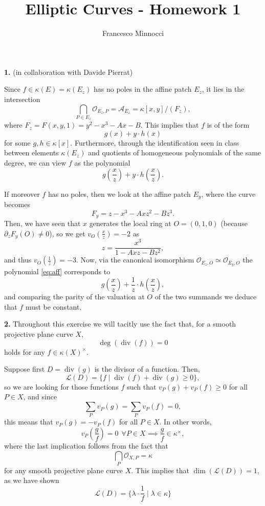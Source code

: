 \documentclass[a4paper]{article}
\title{Elliptic Curves - Homework 1}
\author{Francesco Minnocci}
\renewcommand{\L}{\mathcal{L}}
\renewcommand{\div}{\operatorname{div}}
\renewcommand{\k}{\kappa}
\theoremstyle{definition}
\theoremstyle{definition}
\theoremstyle{remark}
\theoremstyle{definition}
\begin{document}
\maketitle

\textbf{1. }(in collaboration with Davide Pierrat)

Since $f\in \k(E)=\k(E_z)$ has no poles in the affine patch $E_z$, it lies in the intersection
\[
	\bigcap_{P \in E_z} \mathcal{O}_{E_z,P}= \mathcal{A}_{E_z}= \k[x,y]/(F_z),
\]
where $F_z=F(x,y,1)=y^2-x^3-Ax-B$. This implies that $f$ is of the form
\begin{equation}\label{eq:aff}
	g(x)+y\cdot h(x)
\end{equation} for some $g,h \in \k[x]$. Furthermore, through the identification seen in class between elements $\k(E_z)$ and quotients of homogeneous polynomials of the same degree, we can view $f$ as the polynomial
\[
	g\left(\frac{x}{z}\right)+y\cdot h\left(\frac{x}{z}\right).
\]

If moreover $f$ has no poles, then we look at the affine patch $E_y$, where the curve becomes
\[
	F_y=z-x^3-Axz^2-Bz^3.
\]
Then, we have seen that $x$ generates the local ring at $O=(0,1,0)$ (because $\partial_z{F_y}(O)\neq 0$), so we get $v_O{\left(\frac{x}{z}\right)}=-2$ as
\[
	z= \frac{x^3}{1-Axz-Bz^2},
\]
and thus $v_O{\left(\frac{1}{z}\right)}=-3$. Now, via the canonical isomorphism $\mathcal{O}_{E_z,O}\simeq \mathcal{O}_{E_y,O}$ the polynomial \eqref{eq:aff} corresponds to
\[
	g\left(\frac{x}{z}\right)+\frac{1}{z}\cdot h\left(\frac{x}{z}\right),
\]
and comparing the parity of the valuation at $O$ of the two summands we deduce that $f$ must be constant.


\textbf{2.} Throughout this exercise we will tacitly use the fact that, for a smooth projective plane curve $X$,
\[\deg(\div(f))=0\] holds for any $f\in \k(X)^\times$.

Suppose first $D=\div(g)$ is the divisor of a function. Then,
\[
	\L(D)=\{f\mid\div(f)+\div(g)\geq 0\},
\]
so we are looking for those functions $f$ such that $v_P(g)+v_P(f)\geq 0$ for all $P\in X$, and since
\[
	\sum_P{v_P(g)}=\sum_P{v_P(f)}=0,
\]
this means that $v_P(g)=-v_P(f)$ for all $P\in X$. In other words,
\[
	v_P\left(\frac{g}{f}\right)=0 ~~ \forall P \in X \implies \frac{g}{f}\in\k^\times,
\]
where the last implication follows from the fact that
\[
	\bigcap_P{\mathcal{O}_{X,P}}=\k
\]
for any smooth projective plane curve $X$. This implies that $\dim(\L(D))=1$, as we have shown
\[
	\L(D)=\{\lambda \cdot \frac{1}{f}\mid\lambda\in\k\}
\]
\end{document}
